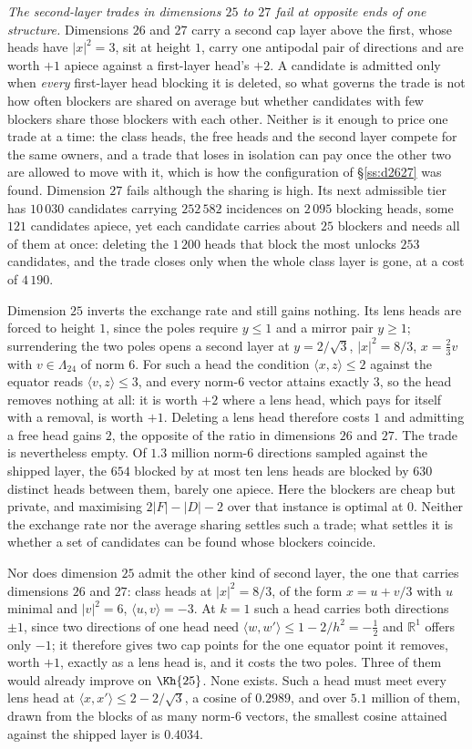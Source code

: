 \documentclass[11pt]{amsart}
\theoremstyle{remark}
\newcommand{\Leech}{\Lambda_{24}}
\newcommand{\ip}[2]{\langle #1,#2\rangle}
\newcommand{\R}{\mathbb{R}}
\begin{document}
\emph{The second-layer trades in dimensions $25$ to $27$ fail at opposite ends
of one structure.} Dimensions $26$ and $27$ carry a second cap layer above the
first, whose heads have $|x|^{2}=3$, sit at height $1$, carry one antipodal pair
of directions and are worth $+1$ apiece against a first-layer head's $+2$. A
candidate is admitted only when \emph{every} first-layer head blocking it is
deleted, so what governs the trade is not how often blockers are shared on
average but whether candidates with few blockers share those blockers with each
other. Neither is it enough to price one trade at a time: the class heads, the
free heads and the second layer compete for the same owners, and a trade that
loses in isolation can pay once the other two are allowed to move with it, which
is how the configuration of \S\ref{ss:d2627} was found. Dimension $27$ fails although the sharing is high. Its next admissible
tier has $10\,030$ candidates carrying $252\,582$ incidences on $2\,095$ blocking
heads, some $121$ candidates apiece, yet each candidate carries about $25$
blockers and needs all of them at once: deleting the $1\,200$ heads that block
the most unlocks $253$ candidates, and the trade closes only when the whole class
layer is gone, at a cost of $4\,190$.

Dimension $25$ inverts the exchange rate and still gains nothing. Its lens heads
are forced to height $1$, since the poles require $y\le1$ and a mirror pair
$y\ge1$; surrendering the two poles opens a second layer at $y=2/\sqrt3$,
$|x|^{2}=8/3$, $x=\tfrac23v$ with $v\in\Leech$ of norm $6$. For such a head the
condition $\ip{x}{z}\le2$ against the equator reads $\ip{v}{z}\le3$, and every
norm-$6$ vector attains exactly $3$, so the head removes nothing at all: it is
worth $+2$ where a lens head, which pays for itself with a removal, is worth
$+1$. Deleting a lens head therefore costs $1$ and admitting a free head gains
$2$, the opposite of the ratio in dimensions $26$ and $27$. The trade is
nevertheless empty. Of $1.3$ million norm-$6$ directions sampled against the
shipped layer, the $654$ blocked by at most ten lens heads are blocked by $630$
distinct heads between them, barely one apiece. Here the blockers are
cheap but private, and maximising $2|F|-|D|-2$ over that instance is optimal at
$0$. Neither the exchange rate nor the average sharing settles such a trade; what
settles it is whether a set of candidates can be found whose blockers coincide.

Nor does dimension $25$ admit the other kind of second layer, the one that carries
dimensions $26$ and $27$: class heads at $|x|^{2}=8/3$, of the form $x=u+v/3$ with
$u$ minimal and $|v|^{2}=6$, $\ip{u}{v}=-3$. At $k=1$ such a head carries both
directions $\pm1$, since two directions of one head need
$\ip{w}{w'}\le1-2/h^{2}=-\tfrac12$ and $\R^{1}$ offers only $-1$; it therefore
gives two cap points for the one equator point it removes, worth $+1$, exactly as
a lens head is, and it costs the two poles. Three of them would already improve on
$\Kh{25}$. None exists. Such a head must meet every lens head at
$\ip{x}{x'}\le2-2/\sqrt3$, a cosine of $0.2989$, and over $5.1$ million of them,
drawn from the blocks of as many norm-$6$ vectors, the smallest cosine attained
against the shipped layer is $0.4034$.
\end{document}
